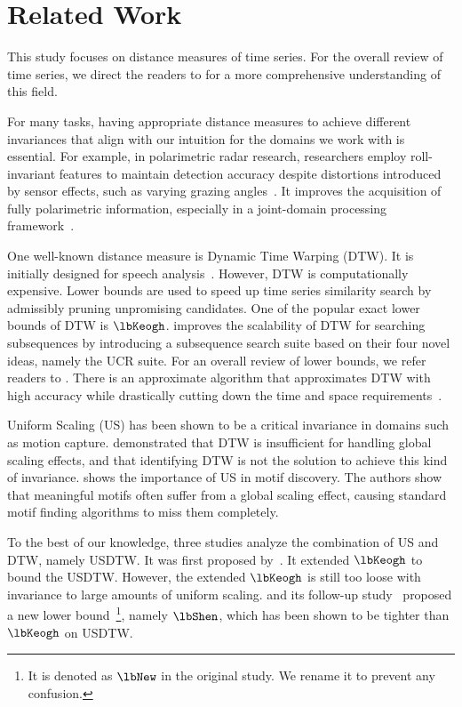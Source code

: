 \section{Related Work} \label{sec:related-work} %

This study focuses on distance measures of time series.
For the overall review of time series, we direct the readers to \cite{fu2011review, esling2012timeseries} for a more comprehensive understanding of this field.

For many tasks, having appropriate distance measures to achieve different invariances that align with our intuition for the domains we work with is essential.
For example, in polarimetric radar research, researchers employ roll-invariant features to maintain detection accuracy despite distortions introduced by sensor effects, such as varying grazing angles~\cite{li2024polsar}.
It improves the acquisition of fully polarimetric information, especially in a joint-domain processing framework~\cite{li2025polyhedral, li2026general}.

One well-known distance measure is Dynamic Time Warping (DTW).
It is initially designed for speech analysis~\cite{sakoe1978dynamic}.
However, DTW is computationally expensive.
Lower bounds are used to speed up time series similarity search by admissibly pruning unpromising candidates.
One of the popular exact lower bounds of DTW is $\lbKeogh$.
%
\cite{rakthanmanon2013addressing} improves the scalability of DTW for searching subsequences by introducing a subsequence search suite based on their four novel ideas, namely the UCR suite.
For an overall review of lower bounds, we refer readers to \cite{tan2019elastic, shifaz2023elastic}.
%
There is an approximate algorithm that approximates DTW with high accuracy while drastically cutting down the time and space requirements~\cite{salvador2007accurate}.

Uniform Scaling (US) has been shown to be a critical invariance in domains such as motion capture.
\cite{keogh2004indexing} demonstrated that DTW is insufficient for handling global scaling effects, and that identifying DTW is not the solution to achieve this kind of invariance. 
\cite{yankov2007detecting} shows the importance of US in motif discovery. The authors show that meaningful motifs often suffer from a global scaling effect, causing standard motif finding algorithms to miss them completely.

To the best of our knowledge, three studies analyze the combination of US and DTW, namely USDTW.
It was first proposed by~\cite{fu2008scaling}.
It extended $\lbKeogh$ to bound the USDTW.
However, the extended $\lbKeogh$ is still too loose with invariance to large amounts of uniform scaling.
\cite{shen2017searching} and its follow-up study~\cite{shen2018accelerating} proposed a new lower bound~\footnote{It is denoted as $\lbNew$ in the original study. We rename it to prevent any confusion.}, namely $\lbShen$, which has been shown to be tighter than $\lbKeogh$ on USDTW.

